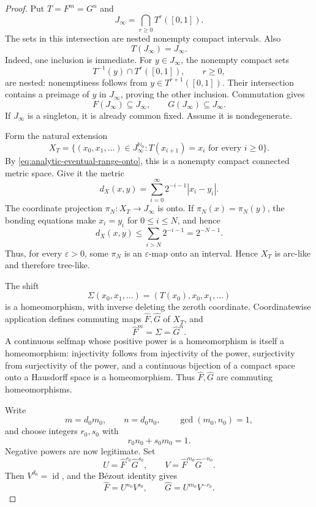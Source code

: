 \documentclass[11pt]{article}
\theoremstyle{definition}
\theoremstyle{remark}
\newcommand{\I}{[0,1]}
\newcommand{\id}{\operatorname{id}}
\begin{document}
\begin{proof}
Put \(T=F^m=G^n\) and
\[
 J_\infty=\bigcap_{r\geq0}T^r(\I).
\]
The sets in this intersection are nested nonempty compact intervals.  Also
\begin{equation}\label{eq:analytic-eventual-range-onto}
 T(J_\infty)=J_\infty.
\end{equation}
Indeed, one inclusion is immediate.  For \(y\in J_\infty\), the nonempty
compact sets
\[
 T^{-1}(y)\cap T^r(\I),\qquad r\geq0,
\]
are nested: nonemptiness follows from \(y\in T^{r+1}(\I)\).  Their
intersection contains a preimage of \(y\) in \(J_\infty\), proving the other
inclusion.  Commutation gives
\[
 F(J_\infty)\subseteq J_\infty,\qquad
 G(J_\infty)\subseteq J_\infty.
\]
If \(J_\infty\) is a singleton, it is already common fixed.  Assume it is
nondegenerate.

Form the natural extension
\[
 X_T=\{(x_0,x_1,\ldots)\in J_\infty^{\mathbb N_0}:
       T(x_{i+1})=x_i\text{ for every }i\geq0\}.
\]
By \eqref{eq:analytic-eventual-range-onto}, this is a nonempty compact
connected metric space.  Give it the metric
\[
 d_X(x,y)=\sum_{i=0}^{\infty}2^{-i-1}|x_i-y_i|.
\]
The coordinate projection \(\pi_N\colon X_T\to J_\infty\) is onto.  If
\(\pi_N(x)=\pi_N(y)\), the bonding equations make \(x_i=y_i\) for
\(0\leq i\leq N\), and hence
\[
 d_X(x,y)\leq\sum_{i>N}2^{-i-1}=2^{-N-1}.
\]
Thus, for every \(\varepsilon>0\), some \(\pi_N\) is an
\(\varepsilon\)-map onto an interval.  Hence \(X_T\) is arc-like and
therefore tree-like.

The shift
\[
 \Sigma(x_0,x_1,\ldots)=(T(x_0),x_0,x_1,\ldots)
\]
is a homeomorphism, with inverse deleting the zeroth coordinate.
Coordinatewise application defines commuting maps \(\widehat F,\widehat G\)
of \(X_T\), and
\[
 \widehat F^m=\Sigma=\widehat G^n.
\]
A continuous selfmap whose positive power is a homeomorphism is itself a
homeomorphism: injectivity follows from injectivity of the power, surjectivity
from surjectivity of the power, and a continuous bijection of a compact space
onto a Hausdorff space is a homeomorphism.  Thus \(\widehat F,\widehat G\)
are commuting homeomorphisms.

Write
\[
 m=d_0m_0,\qquad n=d_0n_0,\qquad \gcd(m_0,n_0)=1,
\]
and choose integers \(r_0,s_0\) with
\[
 r_0n_0+s_0m_0=1.
\]
Negative powers are now legitimate.  Set
\[
 U=\widehat F^{r_0}\widehat G^{s_0},\qquad
 V=\widehat F^{m_0}\widehat G^{-n_0}.
\]
Then \(V^{d_0}=\id\), and the B\'ezout identity gives
\begin{equation}\label{eq:analytic-bezout-split}
 \widehat F=U^{n_0}V^{s_0},\qquad
 \widehat G=U^{m_0}V^{-r_0}.
\end{equation}


\end{proof}
\end{document}
